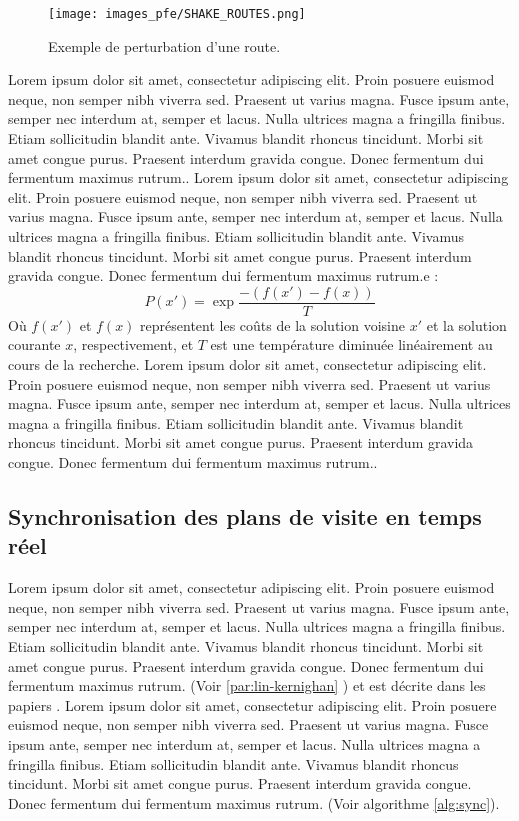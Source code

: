 \medskip

\begin{figure}[hbt!]
  \centering
  \texttt{[image: images\_pfe/SHAKE\_ROUTES.png]}
  \caption{Exemple de perturbation d'une route.}
  \label{fig:shake-route}
\end{figure}
\FloatBarrier

\medskip
Lorem ipsum dolor sit amet, consectetur adipiscing elit. Proin posuere euismod neque, non semper nibh viverra sed. Praesent ut varius magna. Fusce ipsum ante, semper nec interdum at, semper et lacus. Nulla ultrices magna a fringilla finibus. Etiam sollicitudin blandit ante. Vivamus blandit rhoncus tincidunt. Morbi sit amet congue purus. Praesent interdum gravida congue. Donec fermentum dui fermentum maximus rutrum.\parencite{hemmelmayr_variable_2009}. Lorem ipsum dolor sit amet, consectetur adipiscing elit. Proin posuere euismod neque, non semper nibh viverra sed. Praesent ut varius magna. Fusce ipsum ante, semper nec interdum at, semper et lacus. Nulla ultrices magna a fringilla finibus. Etiam sollicitudin blandit ante. Vivamus blandit rhoncus tincidunt. Morbi sit amet congue purus. Praesent interdum gravida congue. Donec fermentum dui fermentum maximus rutrum.e :
\begin{equation*}
    P(x') = \exp{\frac{-(f(x')-f(x))}{T}}
\end{equation*}
 Où $f(x')$ et $f(x)$ représentent les coûts de la solution voisine $x'$ et la solution courante $x$, respectivement, et $T$ est une température diminuée linéairement au cours de la recherche. Lorem ipsum dolor sit amet, consectetur adipiscing elit. Proin posuere euismod neque, non semper nibh viverra sed. Praesent ut varius magna. Fusce ipsum ante, semper nec interdum at, semper et lacus. Nulla ultrices magna a fringilla finibus. Etiam sollicitudin blandit ante. Vivamus blandit rhoncus tincidunt. Morbi sit amet congue purus. Praesent interdum gravida congue. Donec fermentum dui fermentum maximus rutrum..

\subsection{Synchronisation des plans de visite en temps réel}

Lorem ipsum dolor sit amet, consectetur adipiscing elit. Proin posuere euismod neque, non semper nibh viverra sed. Praesent ut varius magna. Fusce ipsum ante, semper nec interdum at, semper et lacus. Nulla ultrices magna a fringilla finibus. Etiam sollicitudin blandit ante. Vivamus blandit rhoncus tincidunt. Morbi sit amet congue purus. Praesent interdum gravida congue. Donec fermentum dui fermentum maximus rutrum. (Voir \ref{par:lin-kernighan} ) et est décrite dans les papiers \parencite{helsgaun_effective_2000,helsgaun_general_2009}. Lorem ipsum dolor sit amet, consectetur adipiscing elit. Proin posuere euismod neque, non semper nibh viverra sed. Praesent ut varius magna. Fusce ipsum ante, semper nec interdum at, semper et lacus. Nulla ultrices magna a fringilla finibus. Etiam sollicitudin blandit ante. Vivamus blandit rhoncus tincidunt. Morbi sit amet congue purus. Praesent interdum gravida congue. Donec fermentum dui fermentum maximus rutrum. (Voir algorithme \ref{alg:sync}).

